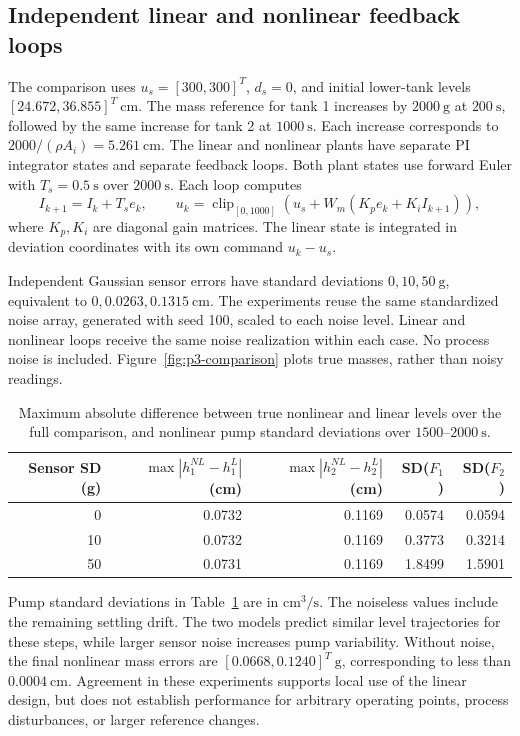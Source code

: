 \subsection{Independent linear and nonlinear feedback loops}

The comparison uses $u_s=[300,300]^T$, $d_s=0$, and initial lower-tank
levels $[24.672,36.855]^T\ \mathrm{cm}$. The mass reference for tank 1
increases by $2000\ \mathrm{g}$ at $200\ \mathrm{s}$, followed by the same
increase for tank 2 at $1000\ \mathrm{s}$. Each increase corresponds to
$2000/(\rho A_i)=5.261\ \mathrm{cm}$.
The linear and nonlinear plants have separate PI integrator states and
separate feedback loops. Both plant states use forward Euler with
$T_s=0.5\ \mathrm{s}$ over $2000\ \mathrm{s}$. Each loop computes
\begin{equation}
 I_{k+1}=I_k+T_s e_k,\qquad
 u_k=\operatorname{clip}_{[0,1000]}
 \left(u_s+W_m(K_p e_k+K_i I_{k+1})\right),
\end{equation}
where $K_p,K_i$ are diagonal gain matrices. The linear state is integrated
in deviation coordinates with its own command $u_k-u_s$.

Independent Gaussian sensor errors have standard deviations
$0,10,50\ \mathrm{g}$, equivalent to $0,0.0263,0.1315\ \mathrm{cm}$.
The experiments reuse the same standardized noise array, generated with
seed 100, scaled to each noise level. Linear and nonlinear loops receive
the same noise realization within each case. No process noise is included.
Figure~\ref{fig:p3-comparison} plots true masses, rather than noisy readings.

\begin{table}[htbp]
 \centering
 \caption{Maximum absolute difference between true nonlinear and linear
 levels over the full comparison, and nonlinear pump standard deviations
 over $1500$--$2000\ \mathrm{s}$.}
 \label{tab:p3-comparison}
 \begin{tabular}{rrrrr}
 \hline
 Sensor SD (g) & $\max|h_1^{NL}-h_1^L|$ (cm) &
 $\max|h_2^{NL}-h_2^L|$ (cm) & SD($F_1$) & SD($F_2$)\\
 \hline
 0 & 0.0732 & 0.1169 & 0.0574 & 0.0594\\
 10 & 0.0732 & 0.1169 & 0.3773 & 0.3214\\
 50 & 0.0731 & 0.1169 & 1.8499 & 1.5901\\
 \hline
 \end{tabular}
\end{table}
Pump standard deviations in Table~\ref{tab:p3-comparison} are in
$\mathrm{cm^3/s}$. The noiseless values include the remaining settling drift.
The two models predict similar level trajectories for these steps, while
larger sensor noise increases pump variability. Without noise, the final
nonlinear mass errors are $[0.0668,0.1240]^T\ \mathrm{g}$, corresponding to
less than $0.0004\ \mathrm{cm}$. Agreement in these experiments supports
local use of the linear design, but does not establish performance for
arbitrary operating points, process disturbances, or larger reference changes.


